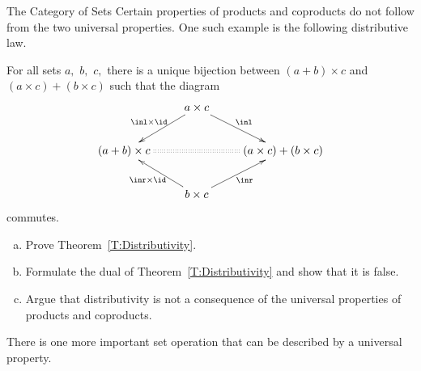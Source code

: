 \begin{unit}{The Category of Sets}
Certain properties of products and coproducts do not follow from the two universal properties.
One such example is the following distributive law.

\begin{theorem}\label{T:Distributivity}
  For all sets \(a,\) \(b,\) \(c,\) there is a unique bijection between \((a + b) \times c\) and \((a \times c) + (b \times c)\) such that the diagram
  \[\xymatrix{
    & a \times c \ar[ld]_-{\inl\times\id}\ar[rd]^-{\inl} \\
    (a + b) \times c \ar@{:}[rr] && (a \times c) + (b \times c) \\
    & b \times c \ar[lu]^-{\inr\times\id}\ar[ru]_-{\inr} \\  
  }\]
  commutes.
\end{theorem}


\begin{problem}\mbox{}
  \begin{enumerate}[(a)]
  \item Prove Theorem~\ref{T:Distributivity}.
  \item Formulate the dual of Theorem~\ref{T:Distributivity} and show that it is false.
  \item Argue that distributivity is not a consequence of the universal properties of products and coproducts.
  \end{enumerate}
\end{problem}

There is one more important set operation that can be described by a universal property.


\end{unit}
